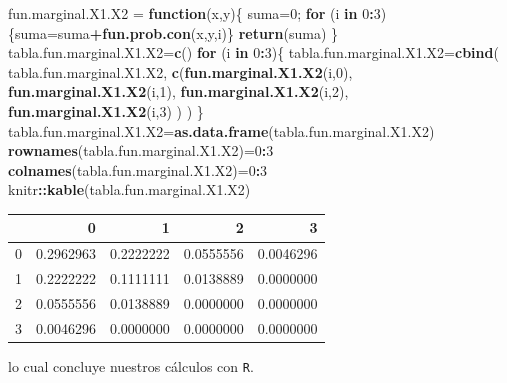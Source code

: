\documentclass[]{book}
\newenvironment{Shaded}{\begin{snugshade}}{\end{snugshade}}
\newcommand{\ControlFlowTok}[1]{\textcolor[rgb]{0.13,0.29,0.53}{\textbf{#1}}}
\newcommand{\DecValTok}[1]{\textcolor[rgb]{0.00,0.00,0.81}{#1}}
\newcommand{\KeywordTok}[1]{\textcolor[rgb]{0.13,0.29,0.53}{\textbf{#1}}}
\newcommand{\NormalTok}[1]{#1}
\newcommand{\OperatorTok}[1]{\textcolor[rgb]{0.81,0.36,0.00}{\textbf{#1}}}
\newcommand{\StringTok}[1]{\textcolor[rgb]{0.31,0.60,0.02}{#1}}
\begin{document}
\begin{Shaded}
\begin{Highlighting}[]
\NormalTok{fun.marginal.X1.X2 =}\StringTok{ }\ControlFlowTok{function}\NormalTok{(x,y)\{}
\NormalTok{  suma=}\DecValTok{0}\NormalTok{;}
  \ControlFlowTok{for}\NormalTok{ (i }\ControlFlowTok{in} \DecValTok{0}\OperatorTok{:}\DecValTok{3}\NormalTok{)\{suma=suma}\OperatorTok{+}\KeywordTok{fun.prob.con}\NormalTok{(x,y,i)\}}
  \KeywordTok{return}\NormalTok{(suma)}
\NormalTok{\}}
\NormalTok{tabla.fun.marginal.X1.X2=}\KeywordTok{c}\NormalTok{()}
\ControlFlowTok{for}\NormalTok{ (i }\ControlFlowTok{in} \DecValTok{0}\OperatorTok{:}\DecValTok{3}\NormalTok{)\{}
\NormalTok{  tabla.fun.marginal.X1.X2=}\KeywordTok{cbind}\NormalTok{(}
\NormalTok{    tabla.fun.marginal.X1.X2,}
    \KeywordTok{c}\NormalTok{(}\KeywordTok{fun.marginal.X1.X2}\NormalTok{(i,}\DecValTok{0}\NormalTok{),                                                            }\KeywordTok{fun.marginal.X1.X2}\NormalTok{(i,}\DecValTok{1}\NormalTok{),                                                            }\KeywordTok{fun.marginal.X1.X2}\NormalTok{(i,}\DecValTok{2}\NormalTok{),                                                            }\KeywordTok{fun.marginal.X1.X2}\NormalTok{(i,}\DecValTok{3}\NormalTok{)}
\NormalTok{    )}
\NormalTok{  )}
\NormalTok{  \}}
\NormalTok{tabla.fun.marginal.X1.X2=}\KeywordTok{as.data.frame}\NormalTok{(tabla.fun.marginal.X1.X2)}
\KeywordTok{rownames}\NormalTok{(tabla.fun.marginal.X1.X2)=}\DecValTok{0}\OperatorTok{:}\DecValTok{3}
\KeywordTok{colnames}\NormalTok{(tabla.fun.marginal.X1.X2)=}\DecValTok{0}\OperatorTok{:}\DecValTok{3}
\NormalTok{knitr}\OperatorTok{::}\KeywordTok{kable}\NormalTok{(tabla.fun.marginal.X1.X2)}
\end{Highlighting}
\end{Shaded}

\begin{tabular}{l|r|r|r|r}
\hline
  & 0 & 1 & 2 & 3\\
\hline
0 & 0.2962963 & 0.2222222 & 0.0555556 & 0.0046296\\
\hline
1 & 0.2222222 & 0.1111111 & 0.0138889 & 0.0000000\\
\hline
2 & 0.0555556 & 0.0138889 & 0.0000000 & 0.0000000\\
\hline
3 & 0.0046296 & 0.0000000 & 0.0000000 & 0.0000000\\
\hline
\end{tabular}

lo cual concluye nuestros cálculos con \texttt{R}.
\end{document}
